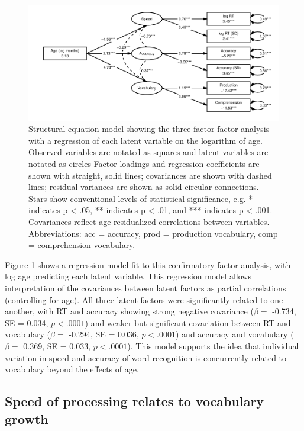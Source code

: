 \documentclass[9pt,twocolumn,twoside,]{pnas-new}
\begin{document}
\begin{figure}
\includegraphics{paper_files/figure-latex/age_regression-1} \caption{Structural equation model showing the three-factor factor analysis with a regression of each latent variable on the logarithm of age. Observed variables are notated as squares and latent variables are notated as circles Factor loadings and regression coefficients are shown with straight, solid lines; covariances are shown with dashed lines; residual variances are shown as solid circular connections. Stars show conventional levels of statistical significance, e.g. * indicates p < .05, ** indicates p < .01, and *** indicates p < .001. Covariances reflect age-residualized correlations between variables. Abbreviations: acc = accuracy, prod = production vocabulary, comp = comprehension vocabulary.}\label{fig:age_regression}
\end{figure}

Figure \ref{fig:age_regression} shows a regression model fit to this
confirmatory factor analysis, with log age predicting each latent
variable. This regression model allows interpretation of the covariances
between latent factors as partial correlations (controlling for age).
All three latent factors were significantly related to one another, with
RT and accuracy showing strong negative covariance (\(\beta=\) -0.734,
SE = 0.034, \(p < .0001\)) and weaker but significant covariation
between RT and vocabulary (\(\beta=\) -0.294, SE = 0.036, \(p < .0001\))
and accuracy and vocabulary (\(\beta=\) 0.369, SE = 0.033,
\(p < .0001\)). This model supports the idea that individual variation
in speed and accuracy of word recognition is concurrently related to
vocabulary beyond the effects of age.

\subsection*{Speed of processing relates to vocabulary
growth}\label{speed-of-processing-relates-to-vocabulary-growth}
\end{document}
